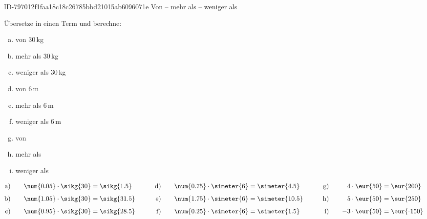\begin{exercise}
      {ID-797012f1faa18c18c26785bbd21015ab6096071e}
      {Von -- mehr als -- weniger als}
  \ifproblem\problem\par
    Übersetze in einen Term und berechne:\\
    \begin{minipage}[t]{0.32\textwidth}
      \begin{enumerate}[a)]
        \item {} von 30\,kg
        \item {} mehr als 30\,kg
        \item {} weniger als 30\,kg
      \end{enumerate}
    \end{minipage}%
    \hfill
    \begin{minipage}[t]{0.32\textwidth}
      \begin{enumerate}[a)]
        \setcounter{enumi}{3}
        \item {} von 6\,m
        \item {} mehr als 6\,m
        \item {} weniger als 6\,m
      \end{enumerate}
    \end{minipage}%
    \hfill
    \begin{minipage}[t]{0.32\textwidth}
      \begin{enumerate}[a)]
        \setcounter{enumi}{6}
        \item {} von 
        \item {} mehr als 
        \item {} weniger als 
      \end{enumerate}
    \end{minipage}
  \fi
  \ifoutcome\outcome\par
    {\setlength{\abovedisplayskip}{0pt}%
    \begin{alignat*}{6}
      \text{a)}&\quad & \num{0.05}\cdot\sikg{30}&=\sikg{1.5}  & \qquad\text{d)}&\quad & \num{0.75}\cdot\simeter{6}&=\simeter{4.5}  & \qquad\text{g)}&\quad &  4\cdot\text{\eur{50}}&=\text{\eur{200}}  \\[1ex]
      \text{b)}&\quad & \num{1.05}\cdot\sikg{30}&=\sikg{31.5} & \qquad\text{e)}&\quad & \num{1.75}\cdot\simeter{6}&=\simeter{10.5} & \qquad\text{h)}&\quad &  5\cdot\text{\eur{50}}&=\text{\eur{250}}  \\[1ex]
      \text{c)}&\quad & \num{0.95}\cdot\sikg{30}&=\sikg{28.5} & \qquad\text{f)}&\quad & \num{0.25}\cdot\simeter{6}&=\simeter{1.5}  & \qquad\text{i)}&\quad & -3\cdot\text{\eur{50}}&=\text{\eur{-150}}
    \end{alignat*}}
  \fi
\end{exercise}
